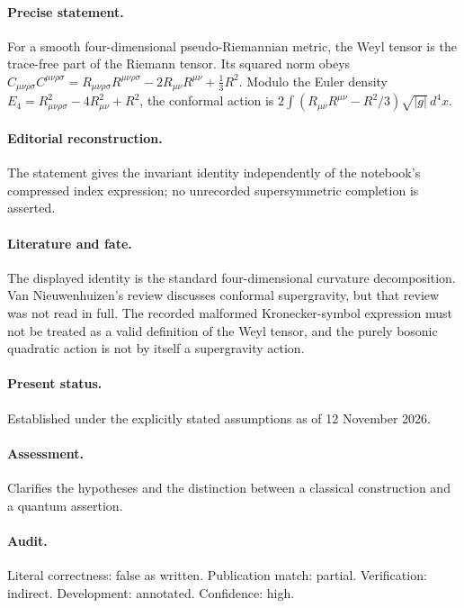 \paragraph{Precise statement.} For a smooth four-dimensional pseudo-Riemannian metric, the Weyl tensor is the trace-free part of the Riemann tensor. Its squared norm obeys \(C_{\mu\nu\rho\sigma}C^{\mu\nu\rho\sigma}=R_{\mu\nu\rho\sigma}R^{\mu\nu\rho\sigma}-2R_{\mu\nu}R^{\mu\nu}+\frac13R^2\). Modulo the Euler density \(E_4=R_{\mu\nu\rho\sigma}^2-4R_{\mu\nu}^2+R^2\), the conformal action is \(2\int(R_{\mu\nu}R^{\mu\nu}-R^2/3)\sqrt{|g|}\,d^4x\).

\paragraph{Editorial reconstruction.} The statement gives the invariant identity independently of the notebook’s compressed index expression; no unrecorded supersymmetric completion is asserted.

\paragraph{Literature and fate.} The displayed identity is the standard four-dimensional curvature decomposition. Van Nieuwenhuizen’s review discusses conformal supergravity, but that review was not read in full. The recorded malformed Kronecker-symbol expression must not be treated as a valid definition of the Weyl tensor, and the purely bosonic quadratic action is not by itself a supergravity action.

\paragraph{Present status.} Established under the explicitly stated assumptions as of 12 November 2026.

\paragraph{Assessment.} Clarifies the hypotheses and the distinction between a classical construction and a quantum assertion.

\paragraph{Audit.} Literal correctness: false as written. Publication match: partial. Verification: indirect. Development: annotated. Confidence: high.

